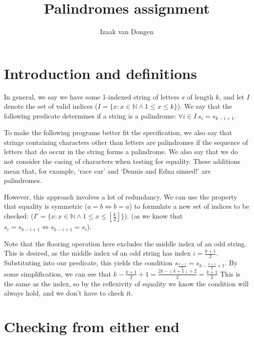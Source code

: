\documentclass[fleqn,a4paper,11pt]{article}
\title{Palindromes assignment}
\author{Izaak van Dongen}
\begin{document}
    \maketitle\thispagestyle{empty} %
    \tableofcontents

    \section{Introduction and definitions}

    In general, we say we have some 1-indexed string of letters \(s\) of length
    \(k\), and let \(I\) denote the set of valid indices
    (\(I = \{x: x \in \mathbb{N} \land 1 \leq x \leq k\}\)).
    We say that the following predicate determines if a string is a palindrome:
    \( \forall i \in I\ s_i = s_{k - i + 1} \).

    To make the following programs better fit the specification, we also say
    that strings containing characters other than letters are palindromes if
    the sequence of letters that do occur in the string forms a palindrome. We
    also say that we do not consider the casing of characters when testing for
    equality. These additions mean that, for example, `race car' and `Dennis
    and Edna sinned!' are palindromes.

    However, this approach involves a lot of redundancy. We can use the
    property that equality is symmetric (\(a = b \iff b = a\)) to formulate a new
    set of indices to be checked:
    (\(I' = \{x: x \in \mathbb{N} \land 1 \leq x \leq
        \left\lfloor \frac{k}{2} \right\rfloor\}\)).
    (as we know that \( s_i = s_{k - i + 1} \iff s_{k - i + 1} = s_i \)).

    Note that the flooring operation here excludes the middle index of an odd
    string. This is desired, as the middle index of an odd string has index
    \( i = \frac{k + 1}{2} \). Substituting into our predicate, this yields the
    condition
    \( s_{\frac{k + 1}{2}} = s_{k - \frac{k + 1}{2} + 1} \).
    By some simplification, we can see that
    \( k - \frac{k + 1}{2} + 1 = \frac{2k - (k + 1) + 2}{2} = \frac{k + 1}{2} \)
    This is the same as the index, so by the reflexivity of equality we know
    the condition will always hold, and we don't have to check it.

    \section{Checking from either end}
\end{document}

